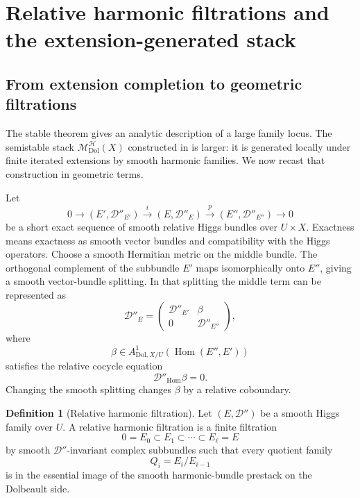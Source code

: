 \documentclass[11pt,reqno]{amsart}
\theoremstyle{definition}
\newtheorem{definition}[theorem]{Definition}
\theoremstyle{remark}
\newcommand{\cD}{\mathcal D}
\newcommand{\cH}{\mathcal H}
\newcommand{\Hom}{\operatorname{Hom}}
\newcommand{\Dol}{\mathrm{Dol}}
\newcommand{\xto}[1]{\xrightarrow{#1}}
\newcommand{\MHDol}{\mathscr M^{\cH}_{\Dol}}
\begin{document}
\section{Relative harmonic filtrations and the extension-generated stack}\label{sec:filtrations}

\subsection{From extension completion to geometric filtrations}

The stable theorem gives an analytic description of a large family locus.  The semistable stack $\MHDol(X)$ constructed in \cite{AzamRayan2026} is larger: it is generated locally under finite iterated extensions by smooth harmonic families.  We now recast that construction in geometric terms.

Let
\[
  0\longrightarrow(E',\cD''_{E'})
  \xto{i}
  (E,\cD''_E)
  \xto{p}
  (E'',\cD''_{E''})
  \longrightarrow0
\]
be a short exact sequence of smooth relative Higgs bundles over $U\times X$.  Exactness means exactness as smooth vector bundles and compatibility with the Higgs operators.  Choose a smooth Hermitian metric on the middle bundle.  The orthogonal complement of the subbundle $E'$ maps isomorphically onto $E''$, giving a smooth vector-bundle splitting.  In that splitting the middle term can be represented as
\begin{equation}\label{eq:extension-matrix}
  \cD''_E
  =\begin{pmatrix}
    \cD''_{E'} & \beta\\
    0 & \cD''_{E''}
  \end{pmatrix},
\end{equation}
where
\[
  \beta\in A^1_{\Dol,X/U}(\Hom(E'',E'))
\]
satisfies the relative cocycle equation
\begin{equation}\label{eq:extension-cocycle}
  \cD''_{\Hom}\beta=0.
\end{equation}
Changing the smooth splitting changes $\beta$ by a relative coboundary.

\begin{definition}[Relative harmonic filtration]\label{def:relative-harmonic-filtration}
Let $(E,\cD'')$ be a smooth Higgs family over $U$.  A relative harmonic filtration is a finite filtration
\begin{equation}\label{eq:relative-harmonic-filtration}
  0=E_0\subset E_1\subset\cdots\subset E_\ell=E
\end{equation}
by smooth $\cD''$-invariant complex subbundles such that every quotient family
\[
  Q_i=E_i/E_{i-1}
\]
is in the essential image of the smooth harmonic-bundle prestack on the Dolbeault side.
\end{definition}
\end{document}
